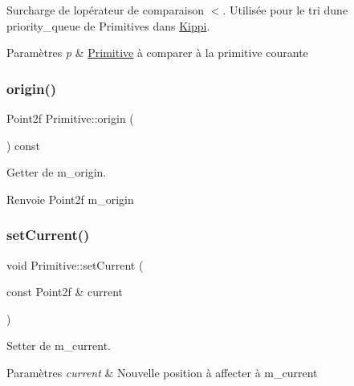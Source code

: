 Surcharge de l\textquotesingle{}opérateur de comparaison $<$. Utilisée pour le tri d\textquotesingle{}une priority\+\_\+queue de Primitives dans \hyperlink{classKippi}{Kippi}. 


\begin{DoxyParams}{Paramètres}
{\em p} & \hyperlink{classPrimitive}{Primitive} à comparer à la primitive courante \\
\hline
\end{DoxyParams}
\mbox{\label{classPrimitive_a4d89d749fdc58956f7ba04620cc556c4}} 
\subsubsection{\texorpdfstring{origin()}{origin()}}
{\footnotesize\ttfamily Point2f Primitive\+::origin (\begin{DoxyParamCaption}{ }\end{DoxyParamCaption}) const}



Getter de m\+\_\+origin. 

\begin{DoxyReturn}{Renvoie}
Point2f m\+\_\+origin 
\end{DoxyReturn}
\mbox{\label{classPrimitive_a658fc13a5d4a524019eab364632bf420}} 
\subsubsection{\texorpdfstring{set\+Current()}{setCurrent()}}
{\footnotesize\ttfamily void Primitive\+::set\+Current (\begin{DoxyParamCaption}\item[{const Point2f \&}]{current }\end{DoxyParamCaption})}



Setter de m\+\_\+current. 


\begin{DoxyParams}{Paramètres}
{\em current} & Nouvelle position à affecter à m\+\_\+current \\
\hline
\end{DoxyParams}
\mbox{\label{classPrimitive_adca41b714ede708b2bddcaca1bc8bc25}} 
